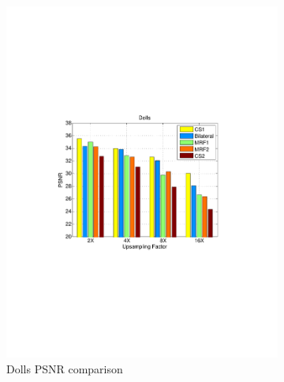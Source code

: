 \documentclass[preprint,10pt,5p,times,twocolumn]{elsarticle}
\begin{document}
\begin{figure}
\begin{subfigure}[b]{0.24\textwidth}
\includegraphics[width=\textwidth]{fig_exp1_dolls_noise.pdf}
\caption*{Dolls PSNR comparison}
\end{subfigure}
\begin{subfigure}[b]{0.24\textwidth}

\end{subfigure}
\end{figure}
\end{document}
